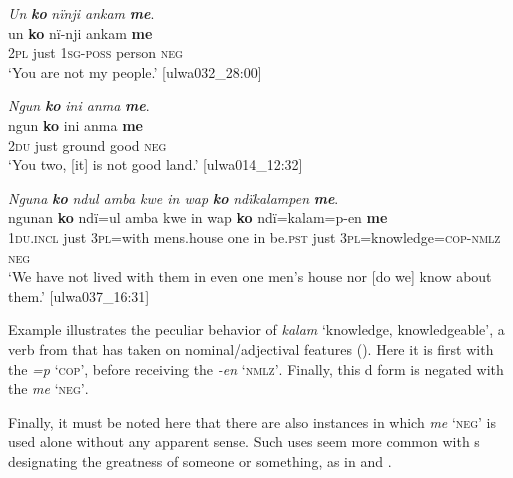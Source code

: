 \ea%
    \label{ex:syntax:162}
          \textit{Un} \textbf{\textit{ko}} \textit{nïnji ankam} \textbf{\textit{me}}.\\
\gll un  \textbf{ko}    nï-nji    ankam  \textbf{me}\\
    2\textsc{pl}  just    1\textsc{sg-poss}  person  \textsc{neg}\\
\glt `You are not my people.’ [ulwa032\_28:00]
\z



\ea%
    \label{ex:syntax:163}
          \textit{Ngun} \textbf{\textit{ko}} \textit{ini anma} \textbf{\textit{me}}.\\
\gll ngun  \textbf{ko}  ini      anma  \textbf{me}\\
    2\textsc{du}  just  ground    good  \textsc{neg}\\
\glt `You two, [it] is not good land.’ [ulwa014\_12:32]
\z

\newpage

\ea%
    \label{ex:syntax:164}
          \textit{Nguna} \textbf{\textit{ko}} \textit{ndul amba kwe in wap} \textbf{\textit{ko}} \textit{ndïkalampen} \textbf{\textit{me}}.\\
\gll ngunan    \textbf{ko}  ndï=ul    amba      kwe  in  wap  \textbf{ko}     ndï=kalam=p-en        \textbf{me}\\
    1\textsc{du.incl}  just  3\textsc{pl}=with  mens.house  one    in  be.\textsc{pst}  just  3\textsc{pl}=knowledge=\textsc{cop{}-nmlz}  \textsc{neg}\\
\glt `We have not lived with them in even one men’s house nor [do we] know about them.’ [ulwa037\_16:31]
\z

Example  illustrates the peculiar behavior of \textit{kalam} ‘knowledge, knowledgeable’, a  verb from  that has taken on nominal/adjectival  features (). Here it is first  with the  \textit{=p} ‘\textsc{cop’}, before receiving the   \textit{-en} ‘\textsc{nmlz’}. Finally, this d form is negated with the  \textit{me} ‘\textsc{neg’}.

  Finally, it must be noted here that there are also instances in which \textit{me} ‘\textsc{neg}’ is used alone without any apparent  sense. Such uses seem more common with s designating the greatness of someone or something, as in  and .

